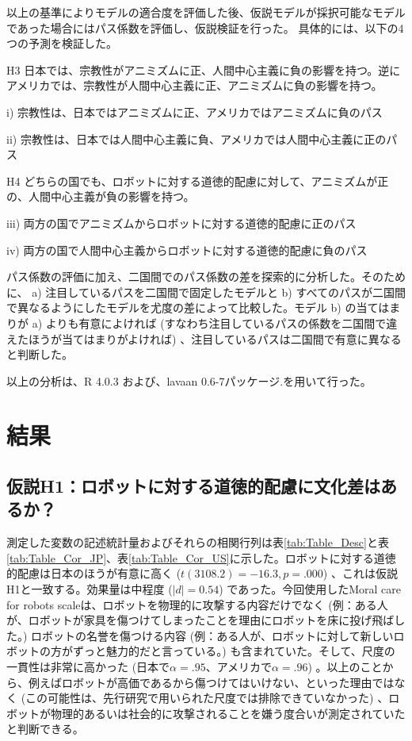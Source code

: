 \documentclass[a4j,12pt]{jreport}
\begin{document}
以上の基準によりモデルの適合度を評価した後、仮説モデルが採択可能なモデルであった場合にはパス係数を評価し、仮説検証を行った。
具体的には、以下の4つの予測を検証した。
\begin{description}
\item{H3} 日本では、宗教性がアニミズムに正、人間中心主義に負の影響を持つ。逆にアメリカでは、宗教性が人間中心主義に正、アニミズムに負の影響を持つ。
\begin{description}
\item{i) } 宗教性は、日本ではアニミズムに正、アメリカではアニミズムに負のパス
\item{ii)} 宗教性は、日本では人間中心主義に負、アメリカでは人間中心主義に正のパス
\end{description}


\item{H4} どちらの国でも、ロボットに対する道徳的配慮に対して、アニミズムが正の、人間中心主義が負の影響を持つ。
\begin{description}
\item{iii)} 両方の国でアニミズムからロボットに対する道徳的配慮に正のパス
\item{iv)} 両方の国で人間中心主義からロボットに対する道徳的配慮に負のパス
\end{description}
\end{description}

パス係数の評価に加え、二国間でのパス係数の差を探索的に分析した。そのために、 a) 注目しているパスを二国間で固定したモデルと b) すべてのパスが二国間で異なるようにしたモデルを尤度の差によって比較した。モデル b) の当てはまりが a) よりも有意によければ (すなわち注目しているパスの係数を二国間で違えたほうが当てはまりがよければ) 、注目しているパスは二国間で有意に異なると判断した。


以上の分析は、R 4.0.3 および、lavaan 0.6-7パッケージ\cite{lavaan}.を用いて行った。

\section{結果}
\subsection{仮説H1：ロボットに対する道徳的配慮に文化差はあるか？}
測定した変数の記述統計量およびそれらの相関行列は表\ref{tab:Table_Desc}と表\ref{tab:Table_Cor_JP}、表\ref{tab:Table_Cor_US}に示した。ロボットに対する道徳的配慮は日本のほうが有意に高く ($t(3108.2) = -16.3, p = .000$) 、これは仮説H1と一致する。効果量は中程度 ($|d| = 0.54$) であった。今回使用したMoral care for robots scaleは、ロボットを物理的に攻撃する内容だけでなく (例：ある人が、ロボットが家具を傷つけてしまったことを理由にロボットを床に投げ飛ばした。) ロボットの名誉を傷つける内容 (例：ある人が、ロボットに対して新しいロボットの方がずっと魅力的だと言っている。) も含まれていた。そして、尺度の一貫性は非常に高かった (日本で$\alpha=.95$、アメリカで$\alpha=.96$) 。以上のことから、例えばロボットが高価であるから傷つけてはいけない、といった理由ではなく (この可能性は、先行研究\cite{okanda}で用いられた尺度では排除できていなかった) 、ロボットが物理的あるいは社会的に攻撃されることを嫌う度合いが測定されていたと判断できる。
\end{document}
